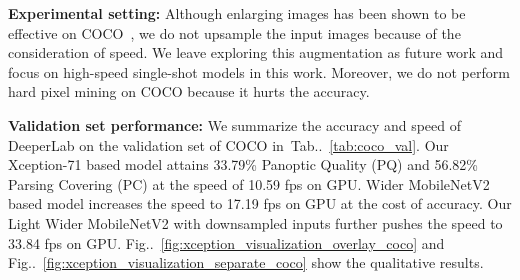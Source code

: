 \documentclass[10pt,twocolumn,letterpaper]{article}
\makeatletter
\def\@onedot{\ifx\@let@token.\else.\null\fi\xspace}
\DeclareRobustCommand\onedot{\futurelet\@let@token\@onedot}
\newcommand{\figref}[1]{Fig\onedot~\ref{#1}}
\newcommand{\tabref}[1]{Tab\onedot~\ref{#1}}
\makeatother
\begin{document}
{\bf Experimental setting:} Although enlarging images has been shown to be effective on COCO~\cite{lin2016feature,he2017mask}, we do not upsample the input images because of the consideration of speed. We leave exploring this augmentation as future work and focus on high-speed single-shot models in this work. Moreover, we do not perform hard pixel mining on COCO because it hurts the accuracy.

\begin{table}[!t]
  \centering
  \caption{DeeperLab performance on the COCO validation set. Xception-71 based model attains higher accuracy while Wider MobileNetV2 (Wider MNV2) based model achieves faster inference. The model can be sped up by simplifying the decoder structure (Light Wider MNV2) with a small accuracy drop. With downsampled inputs, Light Wider MNV2 can reach real-time speed. Note our Xception-71 based model attains the mIOU of 55.26\% for semantic segmentation task.}
  \label{tab:coco_val}
\end{table}

{\bf Validation set performance:} We summarize the accuracy and speed of DeeperLab on the validation set of COCO in~\tabref{tab:coco_val}. Our Xception-71 based model attains 33.79\% Panoptic Quality (PQ) and 56.82\% Parsing Covering (PC) at the speed of 10.59 fps on GPU. Wider MobileNetV2 based model increases the speed to 17.19 fps on GPU at the cost of accuracy. Our Light Wider MobileNetV2 with downsampled inputs further pushes the speed to 33.84 fps on GPU. \figref{fig:xception_visualization_overlay_coco} and \figref{fig:xception_visualization_separate_coco} show the qualitative results.
\end{document}
